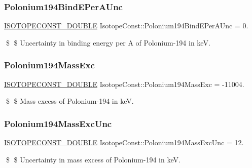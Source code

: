 \subsubsection{\texorpdfstring{Polonium194\+Bind\+E\+Per\+A\+Unc}{Polonium194BindEPerAUnc}}
{\footnotesize\ttfamily \mbox{\hyperlink{group___isotope_const-_macros_ga8f45a7272ce02c0b4c65c44636ed719a}{I\+S\+O\+T\+O\+P\+E\+C\+O\+N\+S\+T\+\_\+\+D\+O\+U\+B\+LE}} Isotope\+Const\+::\+Polonium194\+Bind\+E\+Per\+A\+Unc = 0.}

\$ \$ Uncertainty in binding energy per A of Polonium-\/194 in keV. \mbox{\label{group___isotope_const-_polonium-_po194_ga920ac4a318e2af6c0cb3c913ba6978aa}} 
\subsubsection{\texorpdfstring{Polonium194\+Mass\+Exc}{Polonium194MassExc}}
{\footnotesize\ttfamily \mbox{\hyperlink{group___isotope_const-_macros_ga8f45a7272ce02c0b4c65c44636ed719a}{I\+S\+O\+T\+O\+P\+E\+C\+O\+N\+S\+T\+\_\+\+D\+O\+U\+B\+LE}} Isotope\+Const\+::\+Polonium194\+Mass\+Exc = -\/11004.}

\$ \$ Mass excess of Polonium-\/194 in keV. \mbox{\label{group___isotope_const-_polonium-_po194_gae44baa7b580b6681cd38bea28c3dc83a}} 
\subsubsection{\texorpdfstring{Polonium194\+Mass\+Exc\+Unc}{Polonium194MassExcUnc}}
{\footnotesize\ttfamily \mbox{\hyperlink{group___isotope_const-_macros_ga8f45a7272ce02c0b4c65c44636ed719a}{I\+S\+O\+T\+O\+P\+E\+C\+O\+N\+S\+T\+\_\+\+D\+O\+U\+B\+LE}} Isotope\+Const\+::\+Polonium194\+Mass\+Exc\+Unc = 12.}

\$ \$ Uncertainty in mass excess of Polonium-\/194 in keV. \mbox{\label{group___isotope_const-_polonium-_po194_ga0e85f05ef64b8ec2d139bb90825e3a67}} 
